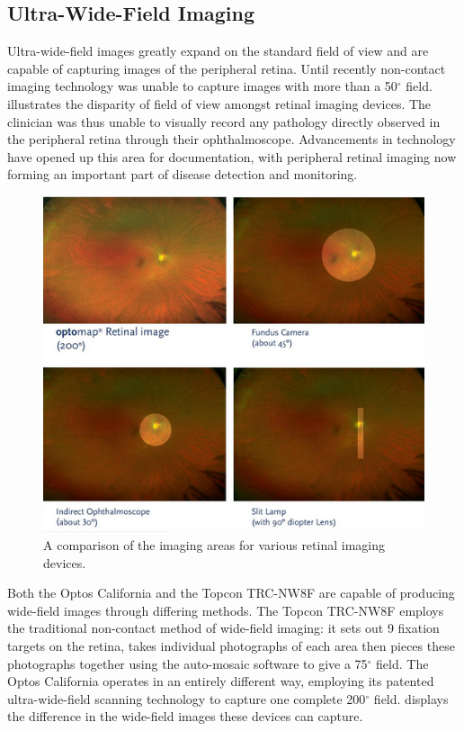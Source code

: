 \subsection{Ultra-Wide-Field Imaging}

Ultra-wide-field images greatly expand on the standard field of view and are
capable of capturing images of the peripheral retina. Until recently
non-contact imaging technology was unable to capture images with more
than a 50$^\circ$ field.  illustrates the disparity of
field of view amongst retinal imaging devices. The clinician was thus
unable to visually record any pathology directly observed in the peripheral
retina through their ophthalmoscope. Advancements in technology have opened
up this area for documentation, with peripheral retinal imaging now forming
an important part of disease detection and monitoring.\cite{8_sides_media_2015}

\begin{figure}[H]
\centering
\includegraphics{figures/uwfcomparison}
\caption{A comparison of the imaging areas for various retinal imaging devices.\cite{1_optos.com_2015}}
\label{fig:uwfc}
   \end{figure}

Both the Optos California and the Topcon TRC-NW8F are capable of producing
wide-field images through differing methods. The Topcon TRC-NW8F employs
the traditional non-contact method of wide-field imaging: it sets out 9
fixation targets on the retina, takes individual photographs of each area
then pieces these photographs together using the auto-mosaic software to
give a 75$^\circ$ field. The Optos California operates in an entirely
different way, employing its patented ultra-wide-field scanning technology
to capture one complete 200$^\circ$ field.  displays the
difference in the wide-field images these devices can capture.


